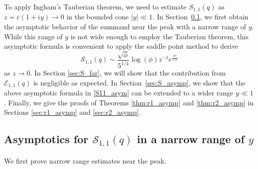 \documentclass[11pt,reqno]{amsart}
\theoremstyle{remark}
\numberwithin{equation}{section}
\begin{document}
To apply Ingham's Tauberian theorem, we need to estimate $S_{1,1}(q)$ as $z=\varepsilon(1+iy) \to 0$ in the bounded cone $|y|\ll 1$. In Section~\ref{sec:S_narrow}, we first obtain the asymptotic behavior of the summand near the peak with a narrow range of $y$. While this range of $y$ is not wide enough to employ the Tauberian theorem, this asymptotic formula is convenient to apply the saddle point method to derive
 \begin{equation} \label{S11_asym}
	\mathcal{S}_{1,1}(q) \sim \frac{\sqrt{\phi} }{5^{1/4}}\log(\phi)  z^{-1} e^{\frac{\pi^2}{15 z}} 
\end{equation}
as $z \to 0$. In Section \ref{sec:S_far}, we will show that the contribution from $\mathcal{E}_{1,1}(q)$ is negligible as expected. In Section~\ref{sec:S_asymp}, we show that the above asymptotic formula in \eqref{S11_asym} can be extended to a wider range $y \ll 1$.  Finally, we give the proofs of Theorems \ref{thm:r1_asymp} and \ref{thm:r2_asymp} in Sections \ref{sec:r1_asymp} and \ref{sec:r2_asymp}. 









\subsection{Asymptotics for $\mathcal{S}_{1,1}(q)$ in a narrow range of $y$}\label{sec:S_narrow}

We first prove narrow range estimates near the peak.
\end{document}
